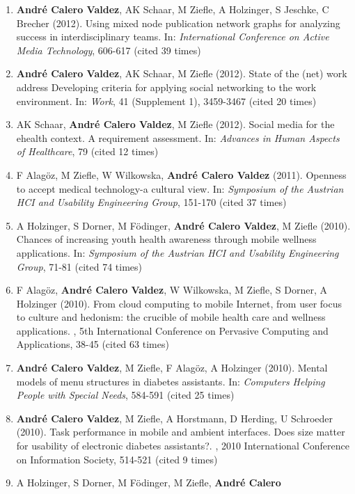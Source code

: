 \documentclass[11pt,a4paper,sans]{moderncv}
\begin{document}
\begin{enumerate}
{  Arbeitsgestaltung und Prävention}, 3 (1), 22-23
\item
  \textbf{André Calero Valdez}, AK Schaar, M Ziefle, A Holzinger, S
  Jeschke, C Brecher (2012). Using mixed node publication network graphs
  for analyzing success in interdisciplinary teams. In:
  \emph{International Conference on Active Media Technology}, 606-617
  (cited 39 times)
\item
  \textbf{André Calero Valdez}, AK Schaar, M Ziefle (2012). State of the
  (net) work address Developing criteria for applying social networking
  to the work environment. In: \emph{Work}, 41 (Supplement 1), 3459-3467
  (cited 20 times)
\item
  AK Schaar, \textbf{André Calero Valdez}, M Ziefle (2012). Social media
  for the ehealth context. A requirement assessment. In: \emph{Advances
  in Human Aspects of Healthcare}, 79 (cited 12 times)
\item
  F Alagöz, M Ziefle, W Wilkowska, \textbf{André Calero Valdez} (2011).
  Openness to accept medical technology-a cultural view. In:
  \emph{Symposium of the Austrian HCI and Usability Engineering Group},
  151-170 (cited 37 times)
\item
  A Holzinger, S Dorner, M Födinger, \textbf{André Calero Valdez}, M
  Ziefle (2010). Chances of increasing youth health awareness through
  mobile wellness applications. In: \emph{Symposium of the Austrian HCI
  and Usability Engineering Group}, 71-81 (cited 74 times)
\item
  F Alagöz, \textbf{André Calero Valdez}, W Wilkowska, M Ziefle, S
  Dorner, A Holzinger (2010). From cloud computing to mobile Internet,
  from user focus to culture and hedonism: the crucible of mobile health
  care and wellness applications. , 5th International Conference on
  Pervasive Computing and Applications, 38-45 (cited 63 times)
\item
  \textbf{André Calero Valdez}, M Ziefle, F Alagöz, A Holzinger (2010).
  Mental models of menu structures in diabetes assistants. In:
  \emph{Computers Helping People with Special Needs}, 584-591 (cited 25
  times)
\item
  \textbf{André Calero Valdez}, M Ziefle, A Horstmann, D Herding, U
  Schroeder (2010). Task performance in mobile and ambient interfaces.
  Does size matter for usability of electronic diabetes assistants?. ,
  2010 International Conference on Information Society, 514-521 (cited 9
  times)
\item
  A Holzinger, S Dorner, M Födinger, M Ziefle, \textbf{André Calero
}
\end{enumerate}
\end{document}
